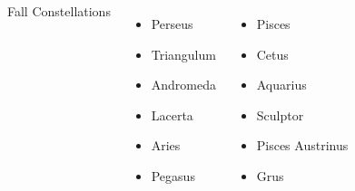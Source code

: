 \begin{frame}{\insertsubsubsectionhead}
  \begin{columns}[T,onlytextwidth]

    \centering

    {\Large Fall Constellations}
    \begin{columns}[T,onlytextwidth]
      \begin{itemize}
        \item Perseus
        \item Triangulum
        \item Andromeda
        \item Lacerta
        \item Aries
        \item Pegasus
      \end{itemize}
      \begin{itemize}
        \item Pisces
        \item Cetus
        \item Aquarius
        \item Sculptor
        \item Pisces Austrinus
        \item Grus
      \end{itemize}
    \end{columns}
  \end{columns}
\end{frame}


